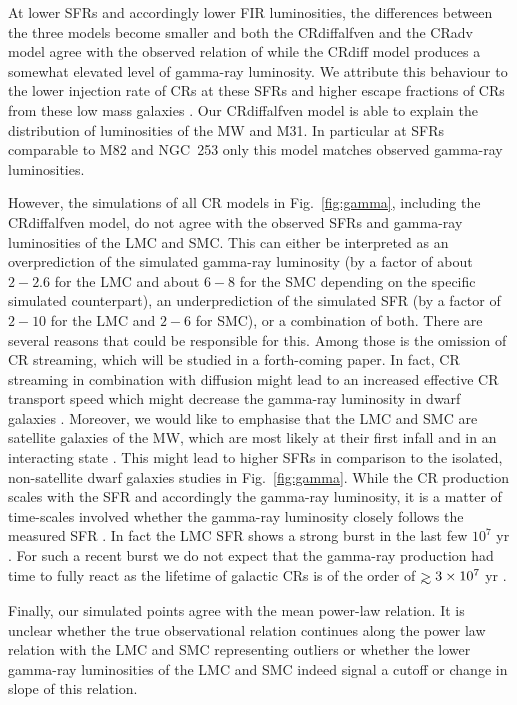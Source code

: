 \documentclass[useAMS,usenatbib]{mnras}
\def\gtrsim{\mathrel{\hbox{\rlap{\hbox{\lower4pt\hbox{$\sim$}}}\hbox{$>$}}}}
\begin{document}
At lower SFRs and accordingly lower FIR luminosities, the differences between the three models become smaller and both the CRdiffalfven and the CRadv model agree with the observed relation of \citet{Rojas-Bravo2016} while the CRdiff model produces a somewhat elevated level of gamma-ray luminosity. We attribute this behaviour to the lower injection rate of CRs at these SFRs and higher escape fractions of CRs from these low mass galaxies \citep[][]{Zhang2019}. Our CRdiffalfven model is able to explain the distribution of luminosities of the MW and M31. In particular at SFRs comparable to M82 and NGC~253 only this model matches observed gamma-ray luminosities. 

However, the simulations of all CR models in Fig.~\ref{fig:gamma}, including the CRdiffalfven model, do not agree with the observed SFRs and gamma-ray luminosities of the LMC and SMC. This can either be interpreted as an overprediction of the simulated gamma-ray luminosity (by a factor of about $2-2.6$ for the LMC and about $6-8$ for the SMC depending on the specific simulated counterpart), an underprediction of the simulated SFR (by a factor of $2-10$ for the LMC and $2-6$ for SMC), or a combination of both. There are several reasons that could be responsible for this. Among those is the omission of CR streaming, which will be studied in a forth-coming paper. In fact, CR streaming in combination with diffusion might lead to an increased effective CR transport speed which might decrease the gamma-ray luminosity in dwarf galaxies \citep[e.g.][]{Salem2016,Jacob2018,Chan2019}. Moreover, we would like to emphasise that the LMC and SMC are satellite galaxies of the MW, which are most likely at their first infall and in an interacting state \citep{Harris2009}. This might lead to higher SFRs in comparison to the isolated, non-satellite dwarf galaxies studies in Fig.\ \ref{fig:gamma}. While the CR production scales with the SFR and accordingly the gamma-ray luminosity, it is a matter of time-scales involved whether the gamma-ray luminosity closely follows the measured SFR \citep[which is intrinsically uncertain by a factor of two for the LMC, see e.g.,][]{Harris2009}. In fact the LMC SFR shows a strong burst in the last few $10^7$ yr \citep[cf.\ Fig. 11 of][]{Harris2009}. For such a recent burst we do not expect that the gamma-ray production had time to fully react as the lifetime of galactic CRs is of the order of $\gtrsim3\times10^7$ yr \citep[e.g.,][]{Simpson1988,Lipari2014}.

Finally, our simulated points agree with the mean power-law relation. It is unclear whether the true observational relation continues along the power law relation with the LMC and SMC representing outliers or whether the lower gamma-ray luminosities of the LMC and SMC indeed signal a cutoff or change in slope of this relation.
\end{document}
